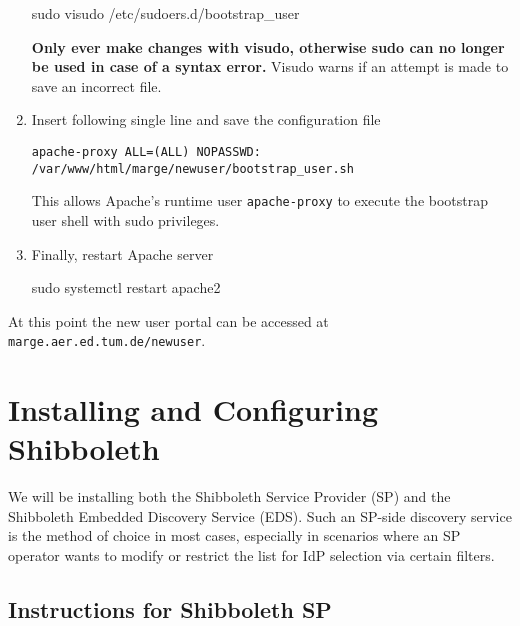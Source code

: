 \begin{enumerate}
\begin{terminal}
        sudo visudo /etc/sudoers.d/bootstrap_user
    \end{terminal}
    \textbf{Only ever make changes with visudo, otherwise sudo can no longer be
    used in case of a syntax error.} Visudo warns if an attempt is made to save
    an incorrect file.
    \item Insert following single line and save the configuration file
    \begin{lstlisting}[frame={l}]
        apache-proxy ALL=(ALL) NOPASSWD: /var/www/html/marge/newuser/bootstrap_user.sh
    \end{lstlisting}
    This allows Apache's runtime user \texttt{apache-proxy} to execute the
    bootstrap user shell with sudo privileges.
    \item Finally, restart Apache server
    \begin{terminal}
        sudo systemctl restart apache2
    \end{terminal}
\end{enumerate}

At this point the new user portal can be accessed at
\texttt{marge.aer.ed.tum.de/newuser}.

\section{Installing and Configuring Shibboleth}\label{section:shibboleth}

We will be installing both the Shibboleth Service Provider (SP) and the
Shibboleth Embedded Discovery Service (EDS). Such an SP-side discovery service
is the method of choice in most cases, especially in scenarios where an SP
operator wants to modify or restrict the list for IdP selection via certain
filters. 

\subsection{Instructions for Shibboleth SP}

